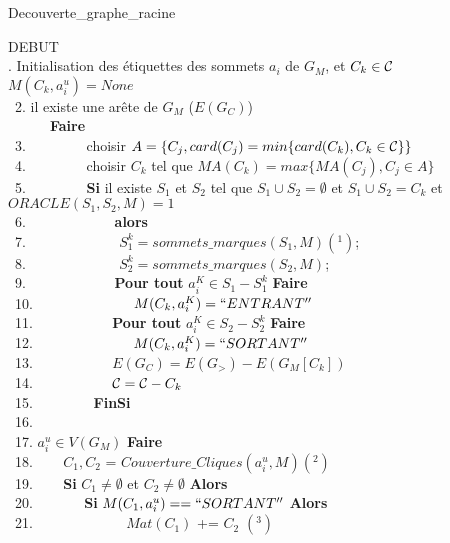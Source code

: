 \begin{algorithm}[!ht]
\caption{Decouverte\_graphe\_racine}
\noindent DEBUT\\
. Initialisation des \'etiquettes des sommets $a_i$ de $G_M$, et $C_k \in {\cal C}$ \\
\noindent $M( C_k, a_i^u) = None$ \\
~2.  il existe une  ar\^ete de $G_M$ ($E(G_C)$) \\
	\indent~~~~~~{\bf Faire}\\
~3.		\indent~~~~~~~~choisir $A = \{C_j , card(C_j) = min\{ card(C_k), C_k \in {\cal C} \}\}$ \\
~4.		\indent~~~~~~~~choisir $C_k$ tel que $MA(C_k) = max\{ MA(C_j), C_j \in A\} $ \\
~5.       	\indent~~~~~~~~{\bf Si} il existe $S_1$ et $S_2$ tel que $S_1 \cup S_2 = \emptyset $ et $S_1 \cup S_2 = C_k $ et $ORACLE(S_1, S_2, M )= 1 $ \\
~6.	       	\indent~~~~~~~~~~~~{\bf alors}\\
~7.	       	\indent~~~~~~~~~~~~ $S_1^k = sommets\_marques(S_1, M)(^1)$; \\
~8.	       	\indent~~~~~~~~~~~~ $S_2^k = sommets\_marques(S_2, M)$; \\
~9.		\indent ~~~~~~~~~~~~{\bf Pour tout} $a_i^K \in S_1 - S_1^k$ {\bf Faire} \\
~10.		\indent ~~~~~~~~~~~~~ $M(C_k, a_i^K) = ``ENTRANT''$ \\
~11.		\indent ~~~~~~~~~~ {\bf Pour tout} $a_i^K \in S_2 - S_2^k$ {\bf Faire} \\
~12.		\indent ~~~~~~~~~~~~~ $M(C_k, a_i^K) = ``SORTANT''$ \\
~13.		\indent~~~~~~~~~~ $E(G_{C}) =  E(G_>)  - E(G_M[C_k])$ \\
~14.		\indent~~~~~~~~~~ ${\cal C} =  {\cal C}  - C_k$ \\
~15.       	\indent~~~~~~~~{\bf FinSi} \\
~16.  \\
~17.  $a_i^u \in V(G_M)$ {\bf Faire} \\
~18. \indent ~~~ $C_1, C_2$ = $Couverture\_Cliques(a_i^u, M)(^2)$\\
~19. \indent ~~~ {\bf Si } $C_1 \neq \emptyset$ et $C_2 \neq \emptyset$ {\bf Alors} \\
~20. \indent ~~~~~~  {\bf Si}  $M(C_1, a_i^u) == ``SORTANT''$ {\bf Alors} \\
~21. \indent ~~~~~~~~~~~~ $Mat(C_1)$ += $C_2$ $(^3)$ \\  

\end{algorithm}
